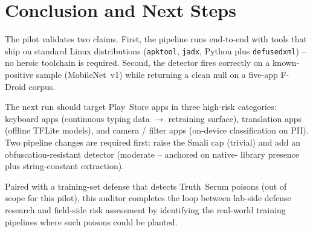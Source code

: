 \documentclass[conference]{IEEEtran}
\begin{document}
\section{Conclusion and Next Steps}
\label{sec:conclusion}

The pilot validates two claims. First, the pipeline runs end-to-end
with tools that ship on standard Linux distributions
(\texttt{apktool}, \texttt{jadx}, Python plus \texttt{defusedxml}) --
no heroic toolchain is required. Second, the detector fires correctly
on a known-positive sample (MobileNet~v1) while returning a clean
null on a five-app F-Droid corpus.

The next run should target Play~Store apps in three high-risk
categories: keyboard apps (continuous typing data $\rightarrow$
retraining surface), translation apps (offline TFLite models), and
camera / filter apps (on-device classification on PII). Two pipeline
changes are required first: raise the Smali cap (trivial) and add an
obfuscation-resistant detector (moderate -- anchored on native-
library presence plus string-constant extraction).

Paired with a training-set defense that detects Truth~Serum poisons
(out of scope for this pilot), this auditor completes the loop between
lab-side defense research and field-side risk assessment by
identifying the real-world training pipelines where such poisons
could be planted.
\end{document}
